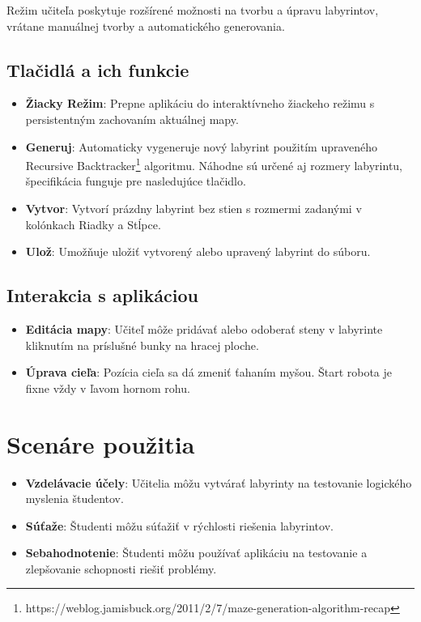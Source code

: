 \documentclass{article}
\begin{document}
Režim učiteľa poskytuje rozšírené možnosti na tvorbu a úpravu labyrintov, vrátane manuálnej tvorby a automatického generovania.

\subsection*{Tlačidlá a ich funkcie}
\begin{itemize}
    \item \textbf{Žiacky Režim}: Prepne aplikáciu do interaktívneho žiackeho režimu s persistentným zachovaním aktuálnej mapy.
    \item \textbf{Generuj}: Automaticky vygeneruje nový labyrint použitím upraveného Recursive Backtracker\footnote{https://weblog.jamisbuck.org/2011/2/7/maze-generation-algorithm-recap} algoritmu. 
    Náhodne sú určené aj rozmery labyrintu, špecifikácia funguje pre nasledujúce tlačidlo.
    \item \textbf{Vytvor}: Vytvorí prázdny labyrint bez stien s rozmermi zadanými v kolónkach Riadky a Stĺpce. 
    \item \textbf{Ulož}: Umožňuje uložiť vytvorený alebo upravený labyrint do súboru.
\end{itemize}

\subsection*{Interakcia s aplikáciou}
\begin{itemize}
    \item \textbf{Editácia mapy}: Učiteľ môže pridávať alebo odoberať steny v labyrinte kliknutím na príslušné bunky na hracej ploche.
    \item \textbf{Úprava cieľa}: Pozícia cieľa sa dá zmeniť ťahaním myšou. Štart robota je fixne vždy v ľavom hornom rohu.
\end{itemize}

\section*{Scenáre použitia}
\begin{itemize}
    \item \textbf{Vzdelávacie účely}: Učitelia môžu vytvárať labyrinty na testovanie logického myslenia študentov.
    \item \textbf{Súťaže}: Študenti môžu súťažiť v rýchlosti riešenia labyrintov.
    \item \textbf{Sebahodnotenie}: Študenti môžu používať aplikáciu na testovanie a zlepšovanie schopnosti riešiť problémy.
\end{itemize}
\end{document}
